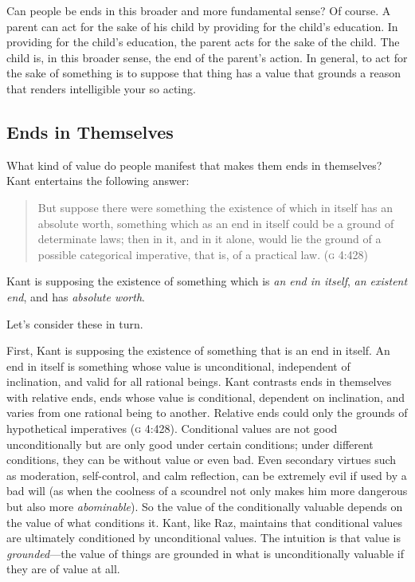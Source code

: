 \documentclass[12pt]{article}
\begin{document}
Can people be ends in this broader and more fundamental sense? Of course. A parent can act for the sake of his child by providing for the child's education. In providing for the child's education, the parent acts for the sake of the child. The child is, in this broader sense, the end of the parent's action. In general, to act for the sake of something is to suppose that thing has a value that grounds a reason that renders intelligible your so acting.


\subsection{Ends in Themselves} \label{sub:ends_in_themselves} %

What kind of value do people manifest that makes them ends in themselves? Kant entertains the following answer: 
\begin{quote}
	But suppose there were something the existence of which in itself has an absolute worth, something which as an end in itself could be a ground of determinate laws; then in it, and in it alone, would lie the ground of a possible categorical imperative, that is, of a practical law. (\textsc{g} 4:428) 
\end{quote}
Kant is supposing the existence of something which is \emph{an end in itself}, \emph{an existent end}, and has \emph{absolute worth}. 

Let's consider these in turn.

First, Kant is supposing the existence of something that is an end in itself. An end in itself is something whose value is unconditional, independent of inclination, and valid for all rational beings. Kant contrasts ends in themselves with relative ends, ends whose value is conditional, dependent on inclination, and varies from one rational being to another. Relative ends could only the grounds of hypothetical imperatives (\textsc{g} 4:428). Conditional values are not good unconditionally but are only good under certain conditions; under different conditions, they can be without value or even bad. Even secondary virtues such as moderation, self-control, and calm reflection, can be extremely evil if used by a bad will (as when the coolness of a scoundrel not only makes him more dangerous but also more \emph{abominable}). So the value of the conditionally valuable depends on the value of what conditions it. Kant, like Raz, maintains that conditional values are ultimately conditioned by unconditional values. The intuition is that value is \emph{grounded}---the value of things are grounded in what is unconditionally valuable if they are of value at all. 
\end{document}

